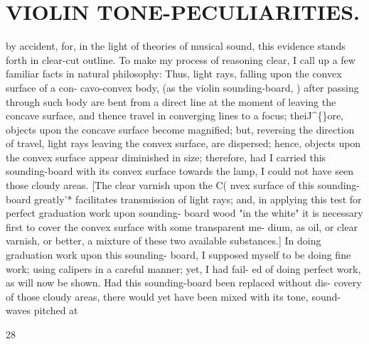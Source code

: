 \documentclass{article}
\begin{document}
\section*{VIOLIN TONE-PECULIARITIES.}
by accident, for, in the light of theories of musical sound, this evidence stands forth in clear-cut outline. To make my process of reasoning clear, I call up a few familiar facts in natural philosophy: Thus, light rays, falling upon the convex surface of a con- cavo-convex body, (as the violin sounding-board, ) after passing through such body are bent from a direct line at the moment of leaving the concave surface, and thence travel in converging lines to a focus; theiJ\textasciicircum\{\}ore, objects upon the concave surface become magnified; but, reversing the direction of travel, light rays leaving the convex surface, are dispersed; hence, objects upon the convex surface appear diminished in size; therefore, had I carried this sounding-board with its convex surface towards the lamp, I could not have seen those cloudy areas. [The clear varnish upon the C( nvex surface of this sounding-board greatly'* facilitates transmission of light rays; and, in applying this test for perfect graduation work upon sounding- board wood "in the white" it is necessary first to cover the convex surface with some transparent me- dium, as oil, or clear varnish, or better, a mixture of these two available substances.] In doing graduation work upon this sounding- board, I supposed myself to be doing fine work; using calipers in a careful manner; yet, I had fail- ed of doing perfect work, as will now be shown. Had this sounding-board been replaced without dis- covery of those cloudy areas, there would yet have been mixed with its tone, sound-waves pitched at

28
\end{document}
